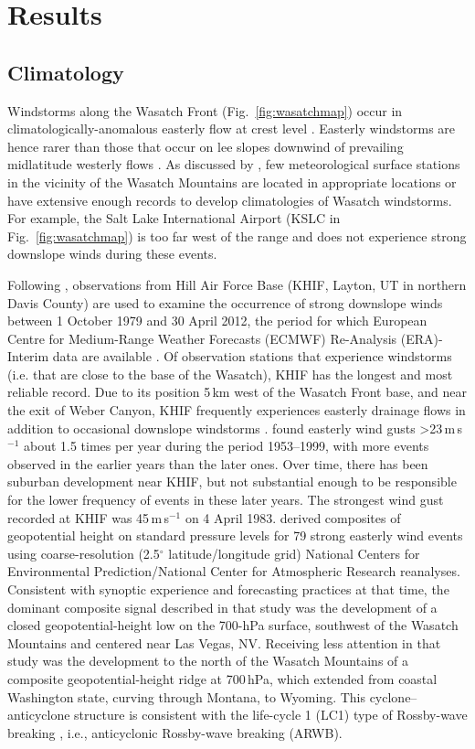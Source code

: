 \documentclass[pdftex,12pt]{article}
\def\mps{m\,s$^{-1}$}
\def\degarc{$^{\circ}$} %
\def\gt{\textgreater}
\begin{document}
\section{Results}
\subsection{Climatology}
Windstorms along the Wasatch Front (Fig.~\ref{fig:wasatchmap}) occur in climatologically-anomalous easterly flow at crest level \citep{Holland2002,Horel2002a}. Easterly windstorms \citep[e.g.,]{Mass1985-at,Jones2002-la} are hence rarer than those that occur on lee slopes downwind of prevailing midlatitude westerly flows \citep[e.g.,]{Lilly1972-ak,Zhong2008-rl}. As discussed by \citet{Holland2002}, few meteorological surface stations in the vicinity of the Wasatch Mountains are located in appropriate locations or have extensive enough records to develop climatologies of Wasatch windstorms. For example, the Salt Lake International Airport (KSLC in Fig.~\ref{fig:wasatchmap}) is too far west of the range and does not experience strong downslope winds during these events.

Following \citet{Holland2002}, observations from Hill Air Force Base (KHIF, Layton, UT in northern Davis County) are used to examine the occurrence of strong downslope winds between 1 October 1979 and 30 April 2012, the period for which European Centre for Medium-Range Weather Forecasts (ECMWF) Re-Analysis (ERA)-Interim data are available \citep{Dee2011}. Of observation stations that experience windstorms (i.e. that are close to the base of the Wasatch), KHIF has the longest and most reliable record. Due to its position 5\,km west of the Wasatch Front base, and near the exit of Weber Canyon, KHIF frequently experiences easterly drainage flows in addition to occasional downslope windstorms \citep{Chrust2013}. \citet{Holland2002} found easterly wind gusts \gt 23\,\mps{} about 1.5 times per year during the period 1953--1999, with more events observed in the earlier years than the later ones. Over time, there has been suburban development near KHIF, but not substantial enough to be responsible for the lower frequency of events in these later years. The strongest wind gust recorded at KHIF was 45\,\mps{} on 4 April 1983. \citet{Holland2002} derived composites of geopotential height on standard pressure levels for 79 strong easterly wind events using coarse-resolution (2.5\degarc{} latitude/longitude grid) National Centers for Environmental Prediction/National Center for Atmospheric Research reanalyses. Consistent with synoptic experience and forecasting practices at that time, the dominant composite signal described in that study was the development of a closed geopotential-height low on the 700-hPa surface, southwest of the Wasatch Mountains and centered near Las Vegas, NV. Receiving less attention in that study was the development to the north of the Wasatch Mountains of a composite geopotential-height ridge at 700\,hPa, which extended from coastal Washington state, curving through Montana, to Wyoming. This cyclone--anticyclone structure is consistent with the life-cycle 1 (LC1) type of Rossby-wave breaking \citep{Thorncroft1993}, i.e., anticyclonic Rossby-wave breaking (ARWB).
\end{document}
